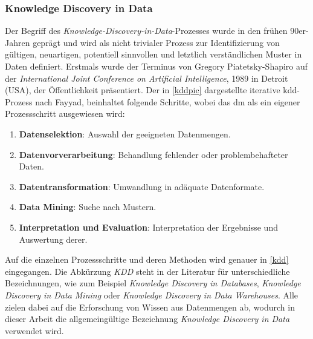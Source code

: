 \subsubsection{Knowledge Discovery in Data}
\label{dmkdd}

Der Begriff des \textit{Knowledge-Discovery-in-Data}-Prozesses wurde in den frühen 90er-Jahren geprägt und wird als \glqq nicht trivialer Prozess zur Identifizierung von gültigen, neuartigen, potentiell sinnvollen und letztlich verständlichen Muster in Daten\grqq{} definiert. Erstmals wurde der Terminus von Gregory Piatetsky-Shapiro auf der \textit{International Joint Conference on Artificial Intelligence}, 1989 in Detroit (USA), der Öffentlichkeit präsentiert. Der in \vref{kddpic} dargestellte iterative \gls{kdd}-Prozess nach Fayyad, beinhaltet folgende Schritte, wobei das \gls{dm} als ein eigener Prozessschritt ausgewiesen wird:

\begin{enumerate}

\item \textbf{Datenselektion}: Auswahl der geeigneten Datenmengen.
\item \textbf{Datenvorverarbeitung}: Behandlung fehlender oder problembehafteter Daten.
\item \textbf{Datentransformation}: Umwandlung in adäquate Datenformate.
\item \textbf{Data Mining}: Suche nach Mustern.
\item \textbf{Interpretation und Evaluation}: Interpretation der Ergebnisse und Auswertung derer.

\end{enumerate}

Auf die einzelnen Prozessschritte und deren Methoden wird genauer in \vref{kdd} eingegangen. Die Abkürzung \textit{KDD} steht in der Literatur für unterschiedliche Bezeichnungen, wie zum Beispiel \textit{Knowledge Discovery in Databases}, \textit{Knowledge Discovery in Data Mining} oder \textit{Knowledge Discovery in Data Warehouses}. Alle zielen dabei auf die Erforschung von Wissen aus Datenmengen ab, wodurch in dieser Arbeit die allgemeingültige Bezeichnung \textit{Knowledge Discovery in Data} verwendet wird.

